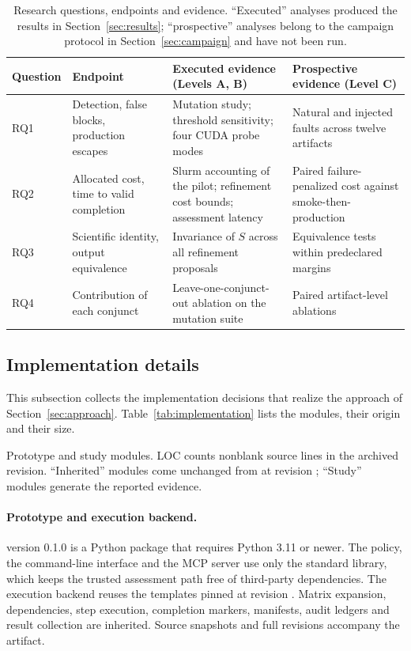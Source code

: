 \begin{table}[t]
\caption{Research questions, endpoints and evidence. ``Executed'' analyses produced the results in Section~\ref{sec:results}; ``prospective'' analyses belong to the campaign protocol in Section~\ref{sec:campaign} and have not been run.}\label{tab:rq-evidence}
\small\begin{tabularx}{\textwidth}{lYYY}
\toprule Question & Endpoint & Executed evidence (Levels A, B) & Prospective evidence (Level C) \\
\midrule
RQ1 & Detection, false blocks, production escapes & Mutation study; threshold sensitivity; four CUDA probe modes & Natural and injected faults across twelve artifacts \\
RQ2 & Allocated cost, time to valid completion & Slurm accounting of the pilot; refinement cost bounds; assessment latency & Paired failure-penalized cost against smoke-then-production \\
RQ3 & Scientific identity, output equivalence & Invariance of $S$ across all refinement proposals & Equivalence tests within predeclared margins \\
RQ4 & Contribution of each conjunct & Leave-one-conjunct-out ablation on the mutation suite & Paired artifact-level ablations \\
\bottomrule\end{tabularx}
\end{table}

\subsection{Implementation details}\label{sec:implementation}
This subsection collects the implementation decisions that realize the approach of Section~\ref{sec:approach}. Table~\ref{tab:implementation} lists the modules, their origin and their size.

\begin{table}[t]
\caption{Prototype and study modules. LOC counts nonblank source lines in the archived revision. ``Inherited'' modules come unchanged from \upstream{} at revision ; ``Study'' modules generate the reported evidence.}\label{tab:implementation}
\small
\end{table}

\paragraph{Prototype and execution backend.} \tool{} version 0.1.0 is a Python package that requires Python 3.11 or newer. The policy, the command-line interface and the MCP server use only the standard library, which keeps the trusted assessment path free of third-party dependencies. The execution backend reuses the \upstream{} templates pinned at revision . Matrix expansion, dependencies, step execution, completion markers, manifests, audit ledgers and result collection are inherited. Source snapshots and full revisions accompany the artifact.

